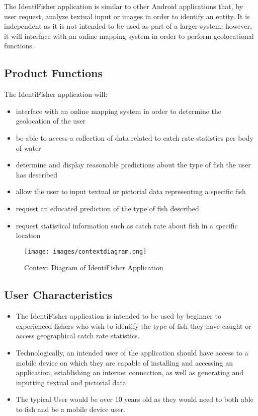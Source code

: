 \documentclass{article}
\begin{document}
The IdentiFisher application is similar to other Android applications that,
by user request, analyze textual input or images in order to identify
an entity. It is independent as it is not intended to be used as part
of a larger system; however, it will interface with an online mapping
system in order to perform geolocational functions.

\subsection{Product Functions}
The IdentiFisher application will: 
\begin{itemize}
	\item
	interface with an online mapping system in order to determine the geolocation of the user
	\item
	be able to access a collection of data related to catch rate statistics per body of water
	\item
	determine and display reasonable predictions about the type of fish the user has described
	\item
	allow the user to input textual or pictorial data representing a specific fish
	\item
	request an educated prediction of the type of fish described
	\item
	request statistical information such as catch rate about fish in a specific location
\end{itemize} 


\begin{figure}[H]
	\texttt{[image: images/contextdiagram.png]}
	\caption{Context Diagram of IdentiFisher Application}
\end{figure}


\subsection{User Characteristics}
\begin{itemize}
	\item
	The IdentiFisher application is intended to be used by beginner to experienced fishers who wish to identify the type of fish they have caught or access geographical catch rate statistics.

	\item
	Technologically, an intended user of the application should have access to a mobile device on which they are capable of installing and accessing an application, establishing an internet connection, as well as generating and inputting textual and pictorial data. 

	\item The typical User would be over 10 years old as they would need to both able to fish and be a mobile device user.
\end{itemize}
\end{document}

